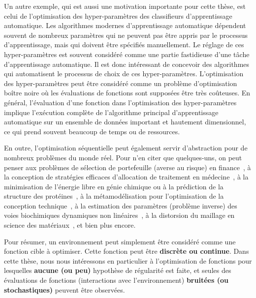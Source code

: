Un autre exemple, qui est aussi une motivation importante pour cette thèse, est celui de l'optimisation des hyper-paramètres des classifieurs d'apprentissage automatique. Les algorithmes modernes d'apprentissage automatique dépendent souvent de nombreux paramètres qui ne peuvent pas être appris par le processus d'apprentissage, mais qui doivent être spécifiés manuellement. Le réglage de ces hyper-paramètres est souvent considéré comme une partie fastidieuse d'une tâche d'apprentissage automatique. Il est donc intéressant de concevoir des algorithmes qui automatisent le processus de choix de ces hyper-paramètres. L'optimisation des hyper-paramètres peut être considéré comme un problème d'optimisation bo\^itre noire où les évaluations de fonctions sont supposées être très coûteuses. En général, l'évaluation d'une fonction dans l'optimisation des hyper-paramètres implique l'exécution complète de l'algorithme principal d'apprentissage automatique sur un ensemble de données important et hautement dimensionnel, ce qui prend souvent beaucoup de temps ou de ressources.

En outre, l'optimisation séquentielle peut également servir d'abstraction pour de nombreux problèmes du monde réel. Pour n'en citer que quelques-uns, on peut penser aux problèmes de sélection de portefeuille (averse au risque) en finance~\citep{ziemba2010}, à la conception de stratégies efficaces d'allocation de traitement en médecine~\citep{durand2018contextual}, à la minimisation de l'énergie libre en génie chimique ou à la prédiction de la structure des protéines~\citep{floudas2000}, à la métamodélisation pour l'optimisation de la conception technique~\citep{wang2007}, à la estimation des paramètres (problème inverse) des voies biochimiques dynamiques non linéaires~\citep{moles2003}, à la distorsion du maillage en science des matériaux~\citep{charpagne2019ebsd}, et bien plus encore. 

Pour résumer, un environnement peut simplement être considéré comme une fonction cible à optimiser. Cette fonction peut être \textbf{discrète ou continue}. Dans cette thèse, nous nous intéressons en particulier à l'optimisation de fonctions pour lesquelles \textbf{aucune (ou peu)} hypothèse de régularité est faite, et seules des évaluations de fonctions (interactions avec l'environnement) \textbf{bruitées     (ou stochastiques)} peuvent être observées.


